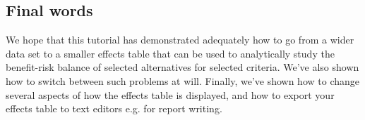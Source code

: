 \documentclass[00_mcda_tutorial.tex]{subfiles}
\begin{document}
\subsection*{Final words}
We hope that this tutorial has demonstrated adequately how to go from a wider data set to a smaller effects table that can be used to analytically study the benefit-risk balance of selected alternatives for selected criteria. We’ve also shown how to switch between such problems at will. Finally, we’ve shown how to change several aspects of how the effects table is displayed, and how to export your effects table to text editors e.g. for report writing.
\end{document}
